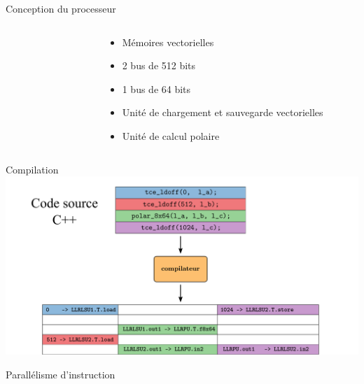 \documentclass[t,compress,mathserif,12pt,xcolor=dvipsnames]{beamer}
\begin{document}
\begin{frame}[c]{Conception du processeur}
	\begin{columns}[T] %
		\begin{column}{.48\textwidth}
			\vspace{-0.5cm}
		\end{column}
		\begin{column}{.07\textwidth}
		\end{column}
		\begin{column}{.41\textwidth}
			\begin{itemize}
				\item<1-> Mémoires vectorielles
				\vspace{0.2cm}
				\item<2-> 2 bus de 512 bits
				\vspace{0.2cm}
				\item<2-> 1 bus de 64 bits
				\vspace{0.2cm}
				\item<3-> Unité de chargement et sauvegarde vectorielles
				\vspace{0.2cm}
				\item<4-> Unité de calcul polaire
			\end{itemize}
		\end{column}
	\end{columns} %
\end{frame}

\begin{frame}[c]{Compilation}
	\includegraphics[width=\textwidth]{fig/compilation}
\end{frame}

\begin{frame}[c]{Parallélisme d'instruction}
\end{frame}
\end{document}
